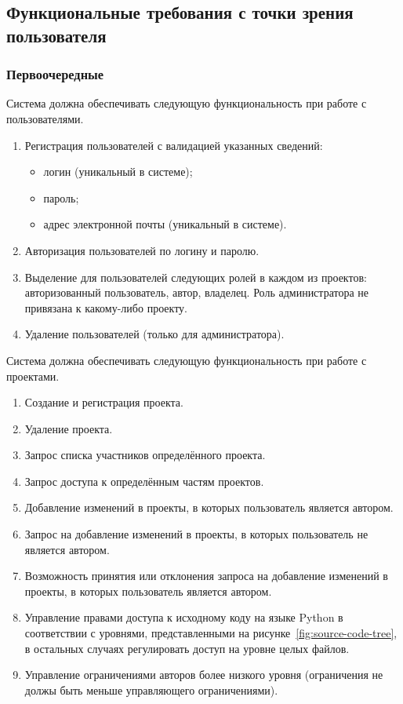 \documentclass{bmstu}
\begin{document}
  \subsection{Функциональные требования с точки зрения пользователя}

  \subsubsection{Первоочередные}

  Система должна обеспечивать следующую функциональность при работе с пользователями.
  \begin{enumerate}[label*=\arabic*.]
    \item Регистрация пользователей с валидацией указанных
      сведений:
      \begin{itemize}[label=---]
        \item логин (уникальный в системе);
        \item пароль;
        \item адрес электронной почты (уникальный в системе).
      \end{itemize}
    \item Авторизация пользователей по логину и паролю.
    \item Выделение для пользователей следующих ролей в каждом из проектов: авторизованный пользователь, автор, владелец. Роль администратора не привязана к какому-либо проекту.
    \item Удаление пользователей (только для администратора).
  \end{enumerate}

  Система должна обеспечивать следующую функциональность при работе с проектами.
  \begin{enumerate}[label*=\arabic*.]
    \item Создание и регистрация проекта.
    \item Удаление проекта.
    \item Запрос списка участников определённого проекта.
    \item Запрос доступа к определённым частям проектов.
    \item Добавление изменений в проекты, в которых пользователь является автором.
    \item Запрос на добавление изменений в проекты, в которых пользователь не является автором.
    \item Возможность принятия или отклонения запроса на добавление изменений в проекты, в которых пользователь является автором.
    \item Управление правами доступа к исходному коду на языке Python в соответствии с уровнями, представленными на рисунке~\ref{fig:source-code-tree}, в остальных случаях регулировать доступ на уровне целых файлов.
    \item Управление ограничениями авторов более низкого уровня (ограничения не должы быть меньше управляющего ограничениями).
  \end{enumerate}
\end{document}
